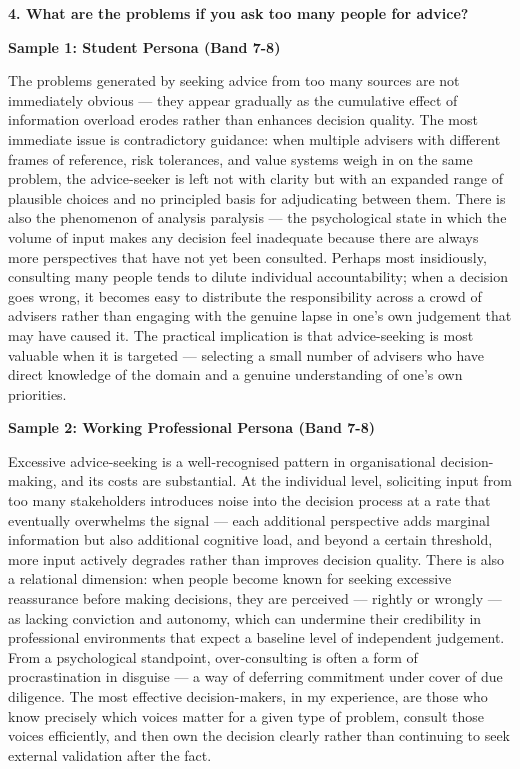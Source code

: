 \separator

\begin{ieltsquestion}
\textbf{4. What are the problems if you ask too many people for advice?}
\end{ieltsquestion}
\textbf{Sample 1: Student Persona (Band 7-8)}

The problems generated by seeking advice from too many sources are not immediately obvious — they appear gradually as the cumulative effect of information overload erodes rather than enhances decision quality. The most immediate issue is contradictory guidance: when multiple advisers with different frames of reference, risk tolerances, and value systems weigh in on the same problem, the advice-seeker is left not with clarity but with an expanded range of plausible choices and no principled basis for adjudicating between them. There is also the phenomenon of analysis paralysis — the psychological state in which the volume of input makes any decision feel inadequate because there are always more perspectives that have not yet been consulted. Perhaps most insidiously, consulting many people tends to dilute individual accountability; when a decision goes wrong, it becomes easy to distribute the responsibility across a crowd of advisers rather than engaging with the genuine lapse in one's own judgement that may have caused it. The practical implication is that advice-seeking is most valuable when it is targeted — selecting a small number of advisers who have direct knowledge of the domain and a genuine understanding of one's own priorities.

\textbf{Sample 2: Working Professional Persona (Band 7-8)}

Excessive advice-seeking is a well-recognised pattern in organisational decision-making, and its costs are substantial. At the individual level, soliciting input from too many stakeholders introduces noise into the decision process at a rate that eventually overwhelms the signal — each additional perspective adds marginal information but also additional cognitive load, and beyond a certain threshold, more input actively degrades rather than improves decision quality. There is also a relational dimension: when people become known for seeking excessive reassurance before making decisions, they are perceived — rightly or wrongly — as lacking conviction and autonomy, which can undermine their credibility in professional environments that expect a baseline level of independent judgement. From a psychological standpoint, over-consulting is often a form of procrastination in disguise — a way of deferring commitment under cover of due diligence. The most effective decision-makers, in my experience, are those who know precisely which voices matter for a given type of problem, consult those voices efficiently, and then own the decision clearly rather than continuing to seek external validation after the fact.

